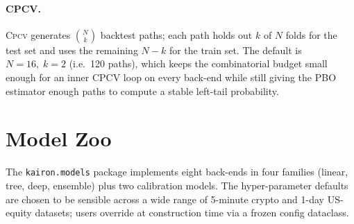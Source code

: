 \documentclass[11pt,a4paper]{article}
\let\oldsection\section
\renewcommand{\section}{\clearpage\oldsection}
\providecommand{\cpcv}{\textsc{Cpcv}}
\begin{document}
\paragraph{CPCV.}
\cpcv{} generates $\binom{N}{k}$ backtest paths; each path
holds out $k$ of $N$ folds for the test set and uses the
remaining $N-k$ for the train set. The default is
$N{=}16,\;k{=}2$ (i.e.\ 120 paths), which keeps the
combinatorial budget small enough for an inner CPCV loop on
every back-end while still giving the PBO estimator enough
paths to compute a stable left-tail probability.

\section{Model Zoo}\label{sec:models}

The \texttt{kairon.models} package implements eight
back-ends in four families (linear, tree, deep, ensemble) plus
two calibration models. The hyper-parameter defaults are
chosen to be sensible across a wide range of 5-minute
crypto and 1-day US-equity datasets; users override at
construction time via a frozen config dataclass.
\end{document}
